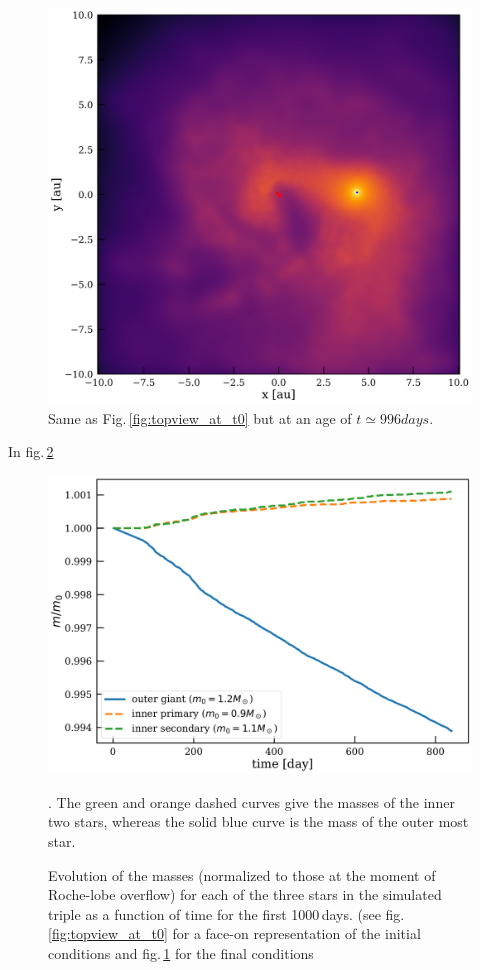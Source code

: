 \documentclass{aastex62}
\begin{document}
\begin{figure}[ht!]
  \includegraphics[width=\columnwidth]{fig_t600_N80000_M012MSun1109MSun_a02au_e00_inc9deg.pdf}
\caption{Same as Fig.\,\ref{fig:topview_at_t0} but at an age of $t
  \simeq 996days$.
\label{fig:topview_at_t1000day}}
\end{figure}

In fig.\,\ref{fig:mass_evolution_for_M1.2M1.1M0.9a02e00i09}

\begin{figure}[ht!]
  \includegraphics[width=\columnwidth]{fig_MvsTime_N80k_M012R100RSun1109MSun_a02au.pdf}
\caption{Evolution of the masses (normalized to those at the moment of
  Roche-lobe overflow) for each of the three stars in the simulated triple as a function of
  time for the first 1000\,days. (see fig.\,\ref{fig:topview_at_t0}
  for a face-on representation of the initial conditions and
  fig.\,\ref{fig:topview_at_t1000day} for the final conditions}.  The
green and orange dashed curves give the masses of the inner two stars,
whereas the solid blue curve is the mass of the outer most star.
\label{fig:mass_evolution_for_M1.2M1.1M0.9a02e00i09}
\end{figure}
\end{document}
